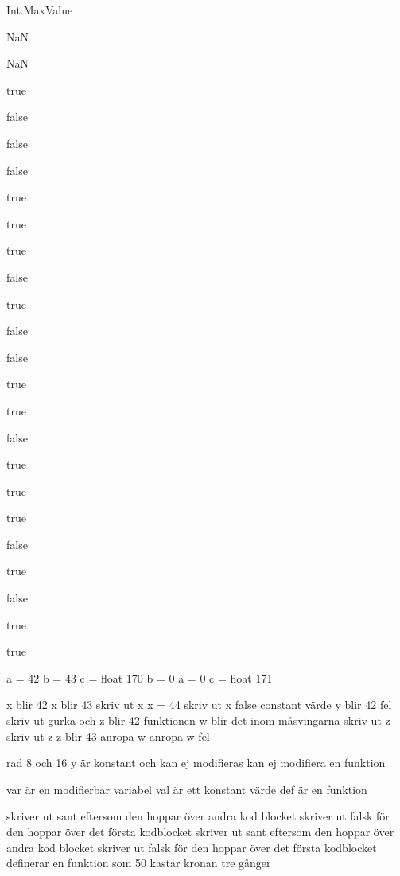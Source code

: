 \Subtask Int.MaxValue

\Subtask NaN

\Subtask NaN

\Subtask 

\Task %
\Subtask true

\Subtask false

\Subtask false

\Subtask false

\Subtask true

\Subtask true

\Subtask true

\Subtask false

\Subtask true

\Subtask false

\Subtask false

\Subtask true

\Subtask true

\Subtask false

\Subtask true

\Subtask true

\Subtask true

\Subtask false

\Subtask true

\Subtask false

\Subtask true

\Subtask true

\Task %
a = 42
b = 43
c = float 170
b = 0
a = 0
c = float 171

\Task %

\Subtask 

x blir 42
x blir 43
skriv ut x
x = 44
skriv ut x
false
constant värde y blir 42
fel
skriv ut gurka och z blir 42
funktionen w blir det inom måsvingarna
skriv ut z
skriv ut z
z blir 43
anropa w
anropa w
fel

\Subtask 

rad 8 och 16 
y är konstant och kan ej modifieras
kan ej modifiera en funktion

\Subtask 

var är en modifierbar variabel
val är ett konstant värde
def är en funktion

\Task %

skriver ut sant eftersom den hoppar över andra kod blocket
skriver ut falsk för den hoppar över det första kodblocket
skriver ut sant eftersom den hoppar över andra kod blocket
skriver ut falsk för den hoppar över det första kodblocket
definerar en funktion som 50%
kastar kronan tre gånger


